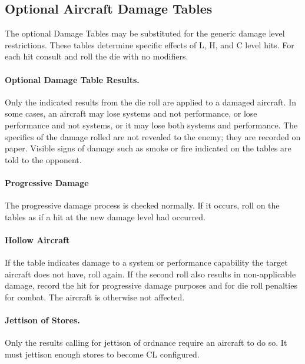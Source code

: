 \subsection{Optional Aircraft Damage Tables}


The optional Damage Tables may be substituted for the generic damage level restrictions. These tables determine specific effects of L, H, and C level hits. For each hit consult  and roll the die with no modifiers. 

\paragraph{Optional Damage Table Results.} Only the indicated results from the die roll are applied to a damaged aircraft. In some cases, an aircraft may lose systems and not performance, or lose performance and not systems, or it may lose both systems and performance. The specifics of the damage rolled are not revealed to the enemy; they are recorded on paper. Visible signs of damage such as smoke or fire indicated on the tables are told to the opponent.

\paragraph{Progressive Damage} The progressive damage process is checked normally. If it occurs, roll on the tables as if a hit at the new damage level had occurred.

\paragraph{Hollow Aircraft} If the table indicates damage to a system or performance capability the target aircraft does not have, roll again. If the second roll also results in non-applicable damage, record the hit for progressive damage purposes and for die roll penalties for combat. The aircraft is otherwise not affected.

\paragraph{Jettison of Stores.} Only the results calling for jettison of ordnance require an aircraft to do so. It must jettison enough stores to become CL configured.

